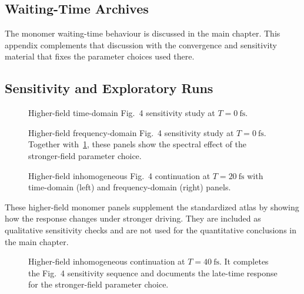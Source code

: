 \subsection{Waiting-Time Archives}

The monomer waiting-time behaviour is discussed in the main chapter. This appendix complements that discussion with the convergence and sensitivity material that fixes the parameter choices used there.

\subsection{Sensitivity and Exploratory Runs}

\begin{figure}[p]
    \centering
    \caption{Higher-field time-domain Fig.~4 sensitivity study at $T=\SI{0}{\femto\second}$.}
    \label{fig:app_monomer_legacy_fig4_t0_time}
\end{figure}

\begin{figure}[p]
    \centering
    \caption{Higher-field frequency-domain Fig.~4 sensitivity study at $T=\SI{0}{\femto\second}$. Together with~\cref{fig:app_monomer_legacy_fig4_t0_time}, these panels show the spectral effect of the stronger-field parameter choice.}
    \label{fig:app_monomer_legacy_fig4_t0_freq}
\end{figure}

\begin{figure}[p]
    \centering
    \caption{Higher-field inhomogeneous Fig.~4 continuation at $T=\SI{20}{\femto\second}$ with time-domain (left) and frequency-domain (right) panels.}
    \label{fig:app_monomer_legacy_fig4_t20}
\end{figure}
These higher-field monomer panels supplement the standardized atlas by showing how the response changes under stronger driving. They are included as qualitative sensitivity checks and are not used for the quantitative conclusions in the main chapter.

\begin{figure}[p]
    \centering
    \caption{Higher-field inhomogeneous continuation at $T=\SI{40}{\femto\second}$. It completes the Fig.~4 sensitivity sequence and documents the late-time response for the stronger-field parameter choice.}
    \label{fig:app_monomer_legacy_fig4_t40_lindblad}
\end{figure}

